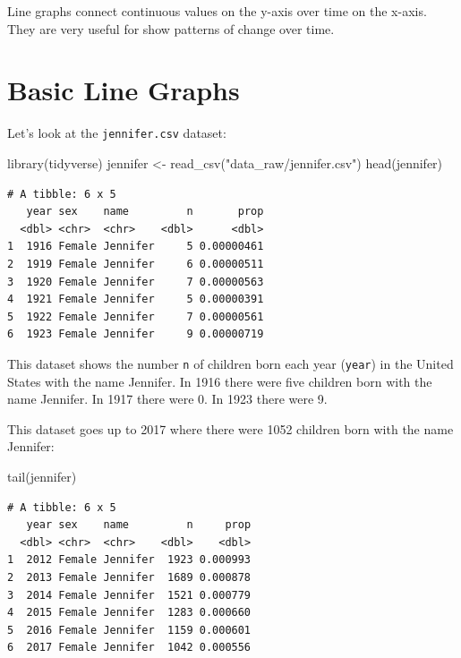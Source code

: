 \documentclass[
  letterpaper,
  DIV=11,
  numbers=noendperiod]{scrreprt}
\newenvironment{Shaded}{\begin{snugshade}}{\end{snugshade}}
\newcommand{\FunctionTok}[1]{\textcolor[rgb]{0.28,0.35,0.67}{#1}}
\newcommand{\NormalTok}[1]{\textcolor[rgb]{0.00,0.23,0.31}{#1}}
\newcommand{\OtherTok}[1]{\textcolor[rgb]{0.00,0.23,0.31}{#1}}
\newcommand{\StringTok}[1]{\textcolor[rgb]{0.13,0.47,0.30}{#1}}
\begin{document}
Line graphs connect continuous values on the y-axis over time on the
x-axis. They are very useful for show patterns of change over time.

\hypertarget{basic-line-graphs}{%
\section{Basic Line Graphs}\label{basic-line-graphs}}

Let's look at the \texttt{jennifer.csv} dataset:

\begin{Shaded}
\begin{Highlighting}[]
\FunctionTok{library}\NormalTok{(tidyverse)}
\NormalTok{jennifer }\OtherTok{\textless{}{-}} \FunctionTok{read\_csv}\NormalTok{(}\StringTok{"data\_raw/jennifer.csv"}\NormalTok{)}
\FunctionTok{head}\NormalTok{(jennifer)}
\end{Highlighting}
\end{Shaded}

\begin{verbatim}
# A tibble: 6 x 5
   year sex    name         n       prop
  <dbl> <chr>  <chr>    <dbl>      <dbl>
1  1916 Female Jennifer     5 0.00000461
2  1919 Female Jennifer     6 0.00000511
3  1920 Female Jennifer     7 0.00000563
4  1921 Female Jennifer     5 0.00000391
5  1922 Female Jennifer     7 0.00000561
6  1923 Female Jennifer     9 0.00000719
\end{verbatim}

This dataset shows the number \texttt{n} of children born each year
(\texttt{year}) in the United States with the name Jennifer. In 1916
there were five children born with the name Jennifer. In 1917 there were
0. In 1923 there were 9.

This dataset goes up to 2017 where there were 1052 children born with
the name Jennifer:

\begin{Shaded}
\begin{Highlighting}[]
\FunctionTok{tail}\NormalTok{(jennifer)}
\end{Highlighting}
\end{Shaded}

\begin{verbatim}
# A tibble: 6 x 5
   year sex    name         n     prop
  <dbl> <chr>  <chr>    <dbl>    <dbl>
1  2012 Female Jennifer  1923 0.000993
2  2013 Female Jennifer  1689 0.000878
3  2014 Female Jennifer  1521 0.000779
4  2015 Female Jennifer  1283 0.000660
5  2016 Female Jennifer  1159 0.000601
6  2017 Female Jennifer  1042 0.000556
\end{verbatim}
\end{document}
